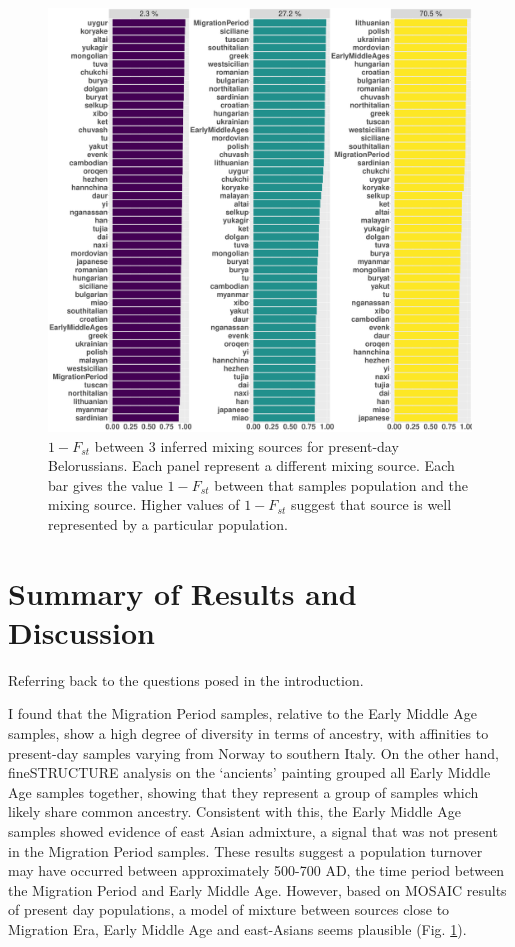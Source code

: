 \begin{figure}[htp]
    \centering
    \includegraphics[width=1.0\textwidth]{../images/chapter5/Fst_plot_HB:belorussian.pdf}
    \caption{$1 - F_{st}$ between 3 inferred mixing sources for present-day Belorussians. Each panel represent a different mixing source. Each bar gives the value $1-F_{st}$ between that samples population and the mixing source. Higher values of $1-F_{st}$ suggest that source is well represented by a particular population. }
    \label{fig:Fst_plot_HB:lithuanian}
\end{figure} 

\section{Summary of Results and Discussion}

Referring back to the questions posed in the introduction.

I found that the Migration Period samples, relative to the Early Middle Age samples, show a high degree of diversity in terms of ancestry, with affinities to present-day samples varying from Norway to southern Italy. On the other hand, fineSTRUCTURE analysis on the `ancients' painting grouped all Early Middle Age samples together, showing that they represent a group of samples which likely share common ancestry. Consistent with this, the Early Middle Age samples showed evidence of east Asian admixture, a signal that was not present in the Migration Period samples. These results suggest a population turnover may have occurred between approximately 500-700 AD, the time period between the Migration Period and Early Middle Age. However, based on MOSAIC results of present day populations, a model of mixture between sources close to Migration Era, Early Middle Age and east-Asians seems plausible (Fig. \ref{fig:Fst_plot_HB:lithuanian}).


